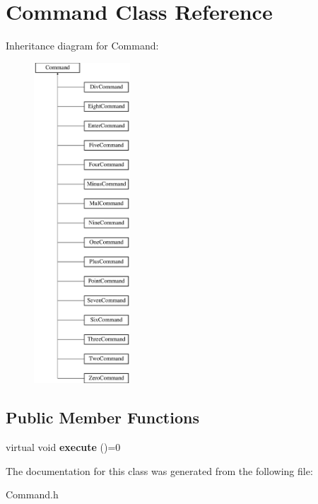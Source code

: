 \hypertarget{class_command}{}\section{Command Class Reference}
\label{class_command}
Inheritance diagram for Command\+:\begin{figure}[H]
\begin{center}
\leavevmode
\includegraphics[height=12.000000cm]{class_command}
\end{center}
\end{figure}
\subsection*{Public Member Functions}
\begin{DoxyCompactItemize}
\item 
\hypertarget{class_command_a6fd7d9bd8df8bfc881e4d6c7cd1878b7}{}virtual void {\bfseries execute} ()=0\label{class_command_a6fd7d9bd8df8bfc881e4d6c7cd1878b7}

\end{DoxyCompactItemize}


The documentation for this class was generated from the following file\+:\begin{DoxyCompactItemize}
\item 
Command.\+h\end{DoxyCompactItemize}
